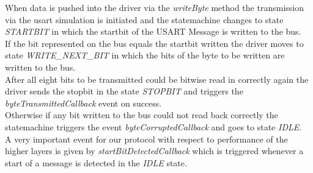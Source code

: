 When data is pushed into the driver via the \textit{writeByte} method the transmission via the usart simulation is initiated and the statemachine changes to state \textit{STARTBIT} in which the startbit of the USART Message is written to the bus.\\

If the bit represented on the bus equals the startbit written the driver moves to state \textit{WRITE\_NEXT\_BIT} in which the bits of the byte to be written are written to the bus.\\

After all eight bits to be transmitted could be bitwise read in correctly again the driver sends the stopbit in the state \textit{STOPBIT} and triggers the \textit{byteTransmittedCallback} event on success.\\

Otherwise if any bit written to the bus could not read back correctly the statemachine triggers the event \textit{byteCorruptedCallback} and goes to state \textit{IDLE}.\\

A very important event for our protocol with respect to performance of the higher layers is given by \textit{startBitDetectedCallback} which is triggered whenever a start of a message is detected in the \textit{IDLE} state.\\